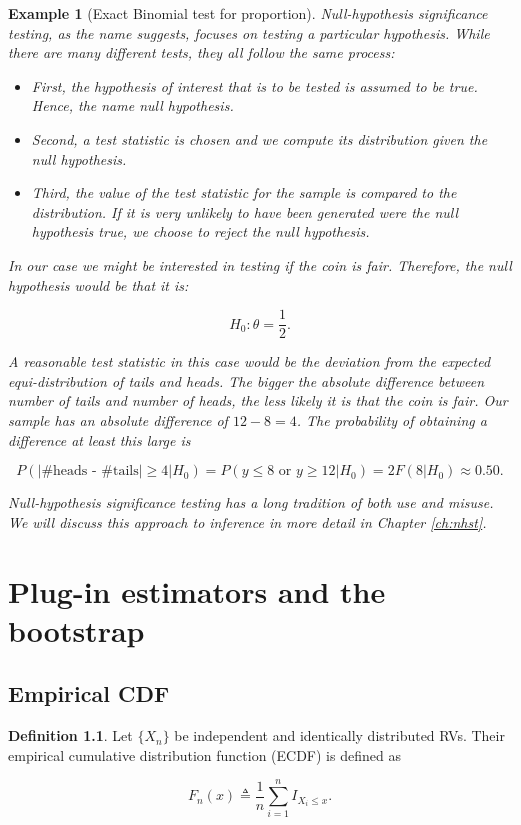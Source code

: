 \documentclass{book}
\theoremstyle{plain}%
\newtheorem{prototheorem}{Example}[section]
\newenvironment{cexample}
   {\colorlet{shadecolor}{gray!10}\begin{shaded}\begin{prototheorem}}
   {\end{prototheorem}\end{shaded}}
\theoremstyle{definition}
\newtheorem{definition}{Definition}[section]
\begin{document}
\begin{cexample}[Exact Binomial test for proportion] Null-hypothesis significance testing, as the name suggests, focuses on testing a particular hypothesis. While there are many different tests, they all follow the same process:

\begin{itemize}
\item First, the hypothesis of interest that is to be tested is assumed to be true. Hence, the name \emph{null hypothesis}.
\item Second, a test statistic is chosen and we compute its distribution given the null hypothesis.
\item Third, the value of the test statistic for the sample is compared to the distribution. If it is very unlikely to have been generated were the null hypothesis true, we choose to reject the null hypothesis.
\end{itemize}

In our case we might be interested in testing if the coin is fair. Therefore, the null hypothesis would be that it is:

$$H_0: \theta = \frac{1}{2}.$$

A reasonable test statistic in this case would be the deviation from the expected equi-distribution of tails and heads. The bigger the absolute difference between number of tails and number of heads, the less likely it is that the coin is fair. Our sample has an absolute difference of $12 - 8 = 4$. The probability of obtaining a difference at least this large is

$$P(|\text{\#heads - \#tails}| \geq 4| H_0)  = P(y \leq 8 \text{ or } y \geq 12| H_0) = 2F(8|H_0) \approx 0.50.$$

Null-hypothesis significance testing has a long tradition of both use and misuse. We will discuss this approach to inference in more detail in Chapter \ref{ch:nhst}.
\end{cexample}


\chapter{Plug-in estimators and the bootstrap}

\section{Empirical CDF}

\begin{definition} Let $\{X_n\}$ be independent and identically distributed RVs. Their empirical cumulative distribution function (ECDF) is defined as

$$F_n(x) \triangleq \frac{1}{n}\sum_{i=1}^n I_{X_i \leq x}.$$
\end{definition}
\end{document}
